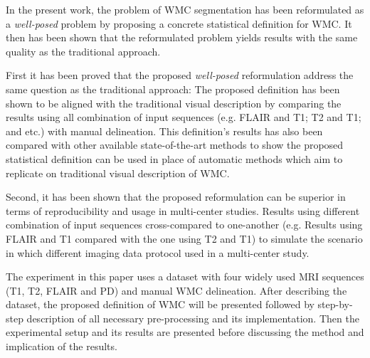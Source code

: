 In the present work, the problem of WMC segmentation has been reformulated as a \textit{well-posed} problem by proposing a concrete statistical definition for WMC. It then has been shown that the reformulated problem yields results with the same quality as the traditional approach.

First it has been proved that the proposed \textit{well-posed} reformulation address the same question as the traditional approach: The proposed definition has been shown to be aligned with the traditional visual description by comparing the results using all combination of input sequences (e.g. FLAIR and T1; T2 and T1; and etc.) with manual delineation. This definition's results has also been compared with other available state-of-the-art methods to show the proposed statistical definition can be used in place of automatic methods which aim to replicate on traditional visual description of WMC.

Second, it has been shown that the proposed reformulation can be superior in terms of reproducibility and usage in multi-center studies. Results using different combination of input sequences cross-compared to one-another (e.g. Results using FLAIR and T1 compared with the one using T2 and T1) to simulate the scenario in which different imaging data protocol used in a multi-center study.

The experiment in this paper uses a dataset with four widely used MRI sequences (T1, T2, FLAIR and PD) and manual WMC delineation. After describing the dataset, the proposed definition of WMC will be presented followed by step-by-step description of all necessary pre-processing and its implementation. Then the experimental setup and its results are presented before discussing the method and implication of the results.

  
  
  
  
  